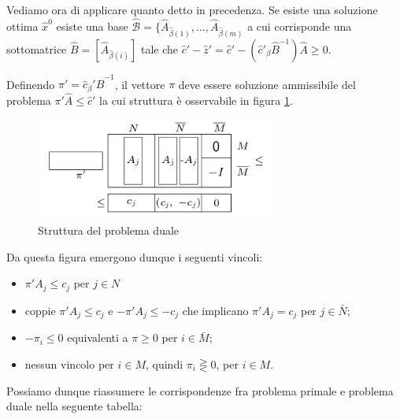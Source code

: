 \documentclass[11pt]{book}
\begin{document}
Vediamo ora di applicare quanto detto in precedenza. Se esiste una
soluzione ottima $\hat{x}^0$ esiste una base $\hat{\mathcal{B}} = \{
\hat{A}_{\hat{\beta}(1)},\dots,\hat{A}_{\hat{\beta}(m)}$ a cui
  corrisponde una sottomatrice $\hat{B} = [\hat{A}_{\hat{\beta}(i)}]$
  tale che $\hat{c}' - \hat{z}' = \hat{c}' - (\hat{c}'_\beta
  \hat{B}^{-1})\hat{A} \geq 0$.

Definendo $\pi' = \hat{c}_\beta'\hat{B}^{-1}$, il vettore $\pi$ deve
essere soluzione ammissibile del problema $\pi'\hat{A} \leq \hat{c}'$
la cui struttura \`e osservabile in figura \ref{cap5fig54}.

\begin{figure}[h!]
  \centering
  \includegraphics[width=0.7\textwidth]{images/cap5fig54.png}
  \caption{Struttura del problema duale}
  \label{cap5fig54}
\end{figure}

Da questa figura emergono dunque i seguenti vincoli:

\begin{itemize}
  
\item $\pi'A_j \leq c_j$ per $j \in N$
\item coppie $\pi'A_j \leq c_j$ e $-\pi'A_j \leq -c_j$ che implicano
  $\pi'A_j = c_j$ per $j \in \bar{N}$;
\item $-\pi_i \leq 0$ equivalenti a $\pi \geq 0$ per $i \in \bar{M}$;
\item nessun vincolo per $i \in M$, quindi $\pi_i \gtreqless 0$, per
  $i \in M$.

\end{itemize}

Possiamo dunque riassumere le corrispondenze fra problema primale e
problema duale nella seguente tabella:
\end{document}
